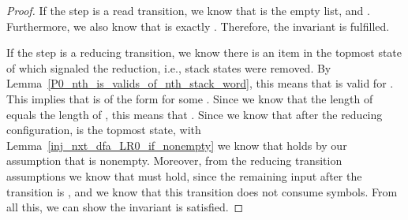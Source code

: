 \begin{isabellebody}
\begin{isamarkuptext}
\begin{lemma}
\begin{proof}
If the step is a read transition, we know that  is the empty list, and . 
Furthermore, we also know that  is exactly 
. Therefore, the invariant is fulfilled.

If the step is a reducing transition, we know there is an item  in the topmost
state of  which signaled the reduction, i.e., \isa{{\isacharbar}{\kern0pt}\isafree{{\isasymbeta}}{\isacharbar}{\kern0pt}} stack states 
were removed. By Lemma~\ref{P0_nth_is_valids_of_nth_stack_word}, this means that 
is valid for . This implies that \isa{{\isasymalpha}} is of the form  for some
. Since we know that the length of \isa{{\isasymbeta}} equals the length of , this means
that . Since we know that after the reducing configuration,
 is the topmost state, with Lemma~\ref{inj_nxt_dfa_LR0_if_nonempty} we know that
 holds by our assumption that  is nonempty. Moreover, from
the reducing transition assumptions we know that  must hold, since the remaining
input after the transition is , and we know that this transition does not consume symbols. From
all this, we can show the invariant is satisfied.


\end{proof}
\end{lemma}
\end{isamarkuptext}
\end{isabellebody}
